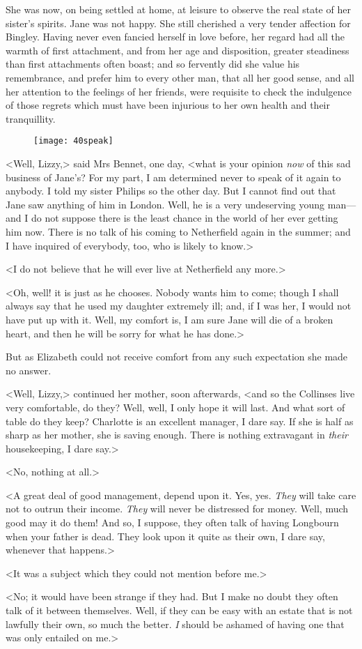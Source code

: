 She was now, on being settled at home, at leisure to observe the real state of her sister's spirits. Jane was not happy. She still cherished a very tender affection for Bingley. Having never even fancied herself in love before, her regard had all the warmth of first attachment, and from her age and disposition, greater steadiness than first attachments often boast; and so fervently did she value his remembrance, and prefer him to every other man, that all her good sense, and all her attention to the feelings of her friends, were requisite to check the indulgence of those regrets which must have been injurious to her own health and their tranquillity.

\begin{figure}[h!]
\centering
\texttt{[image: 40speak]}
\end{figure}

<Well, Lizzy,> said Mrs Bennet, one day, <what is your opinion \textit{now} of this sad business of Jane's? For my part, I am determined never to speak of it again to anybody. I told my sister Philips so the other day. But I cannot find out that Jane saw anything of him in London. Well, he is a very undeserving young man—and I do not suppose there is the least chance in the world of her ever getting him now. There is no talk of his coming to Netherfield again in the summer; and I have inquired of everybody, too, who is likely to know.>

<I do not believe that he will ever live at Netherfield any more.>

<Oh, well! it is just as he chooses. Nobody wants him to come; though I shall always say that he used my daughter extremely ill; and, if I was her, I would not have put up with it. Well, my comfort is, I am sure Jane will die of a broken heart, and then he will be sorry for what he has done.>

But as Elizabeth could not receive comfort from any such expectation she made no answer.

<Well, Lizzy,> continued her mother, soon afterwards, <and so the Collinses live very comfortable, do they? Well, well, I only hope it will last. And what sort of table do they keep? Charlotte is an excellent manager, I dare say. If she is half as sharp as her mother, she is saving enough. There is nothing extravagant in \textit{their} housekeeping, I dare say.>

<No, nothing at all.>

<A great deal of good management, depend upon it. Yes, yes. \textit{They} will take care not to outrun their income. \textit{They} will never be distressed for money. Well, much good may it do them! And so, I suppose, they often talk of having Longbourn when your father is dead. They look upon it quite as their own, I dare say, whenever that happens.>

<It was a subject which they could not mention before me.>

<No; it would have been strange if they had. But I make no doubt they often talk of it between themselves. Well, if they can be easy with an estate that is not lawfully their own, so much the better. \textit{I} should be ashamed of having one that was only entailed on me.>